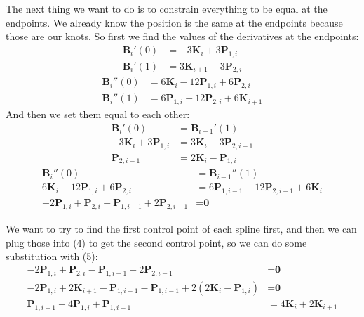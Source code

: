\documentclass[10pt]{article}
\begin{document}
	The next thing we want to do is to constrain everything to be equal at the endpoints. We already know the position is the same at the endpoints because those are our knots. So first we find the values of the derivatives at the endpoints:
	\begin{align*}
		\textbf{B}_{i}'(0) &= -3\textbf{K}_{i} + 3\textbf{P}_{1,i}\\
		\textbf{B}_{i}'(1) &= 3\textbf{K}_{i+1} - 3\textbf{P}_{2,i}
	\end{align*}
	\begin{align*}
		\textbf{B}_{i}''(0) &= 6\textbf{K}_{i} - 12\textbf{P}_{1,i} + 6\textbf{P}_{2,i}\\
		\textbf{B}_{i}''(1) &= 6\textbf{P}_{1,i} - 12\textbf{P}_{2,i} + 6\textbf{K}_{i+1}
	\end{align*}
	And then we set them equal to each other:
	\begin{align}
		\textbf{B}_{i}'(0) &= \textbf{B}_{i-1}'(1)\nonumber\\
		-3\textbf{K}_{i} + 3\textbf{P}_{1,i} &= 3\textbf{K}_{i} - 3\textbf{P}_{2,i-1}\nonumber\\
		\textbf{P}_{2,i-1} &= 2\textbf{K}_{i} - \textbf{P}_{1,i}
	\end{align}
	\begin{align}
		\textbf{B}_{i}''(0) &= \textbf{B}_{i-1}''(1)\nonumber\\
		6\textbf{K}_{i} - 12\textbf{P}_{1,i} + 6\textbf{P}_{2,i} &= 6\textbf{P}_{1,i-1} - 12\textbf{P}_{2,i-1} + 6\textbf{K}_{i}\nonumber\\
		-2\textbf{P}_{1,i} + \textbf{P}_{2,i} - \textbf{P}_{1,i-1} + 2\textbf{P}_{2,i-1} &= \textbf{0}
	\end{align}

	We want to try to find the first control point of each spline first, and then we can plug those into (4) to get the second control point, so we can do some substitution with (5):
	\begin{align}
		-2\textbf{P}_{1,i} + \textbf{P}_{2,i} - \textbf{P}_{1,i-1} + 2\textbf{P}_{2,i-1} &= \textbf{0}\nonumber\\
		-2\textbf{P}_{1,i} + 2\textbf{K}_{i+1} - \textbf{P}_{1,i+1} - \textbf{P}_{1,i-1} + 2(2\textbf{K}_{i} - \textbf{P}_{1,i}) &= \textbf{0}\nonumber\\
		\textbf{P}_{1,i-1} + 4\textbf{P}_{1,i} + \textbf{P}_{1,i+1} &= 4\textbf{K}_{i} + 2\textbf{K}_{i+1}
	\end{align}
\end{document}
